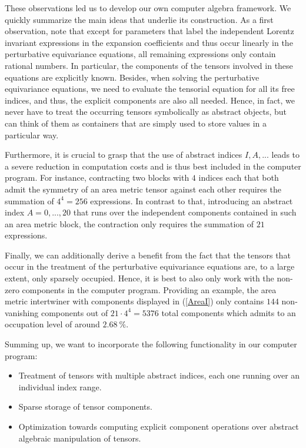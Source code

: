 These observations led us to develop our own computer algebra framework. We quickly summarize the main ideas that underlie its construction.
As a first observation, note that except for parameters that label the independent Lorentz invariant expressions in the expansion coefficients and thus occur linearly in the perturbative equivariance equations, all remaining expressions only contain rational numbers. In particular, the components of the tensors involved in these equations are explicitly known. Besides, when solving the perturbative equivariance equations, we need to evaluate the tensorial equation for all its free indices, and thus, the explicit components are also all needed. Hence, in fact, we never have to treat the occurring tensors symbolically as abstract objects, but can think of them as containers that are simply used to store values in a particular way. 

Furthermore, it is crucial to grasp that the use of abstract indices $I, A, ...$ leads to a severe reduction in computation costs and is thus best included in the computer program. For instance, contracting two blocks with $4$ indices each that both admit the symmetry of an area metric tensor against each other requires the summation of $4^4 = 256$ expressions. In contrast to that, introducing an abstract index $A = 0,...,20$ that runs over the independent components contained in such an area metric block, the contraction only requires the summation of $21$ expressions.

Finally, we can additionally derive a benefit from the fact that the tensors that occur in the treatment of the perturbative equivariance equations are, to a large extent, only sparsely occupied. Hence, it is best to also only work with the non-zero components in the computer program. Providing an example, the area metric intertwiner with components displayed in (\ref{AreaI}) only contains $144$ non-vanishing components out of $21 \cdot 4^4 = 5376$ total components which admits to an occupation level of around $2.68 \ \%$.

Summing up, we want to incorporate the following functionality in our computer program:
\begin{itemize}
    \item Treatment of tensors with multiple abstract indices, each one running over an individual index range. 
    \item Sparse storage of tensor components.
    \item Optimization towards computing explicit component operations over abstract algebraic manipulation of tensors.
\end{itemize}

